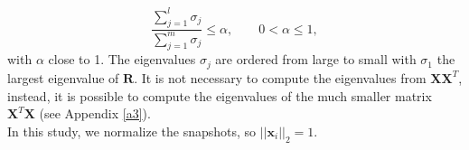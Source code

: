 \documentclass[12pt]{article}
\begin{document}
\begin{equation}
\frac{\sum_{j=1}^l\sigma_j}{\sum_{j=1}^m\sigma_j}\leq \alpha, \qquad 0<\alpha \leq 1,
\end{equation}
with $\alpha$ close to 1. The eigenvalues $\sigma_j$ are ordered from large to small with $\sigma_1$
the largest eigenvalue of $\mathbf{R}$. 
It is not necessary to compute the eigenvalues from $\mathbf{X}\mathbf{X}^T$, instead, it is possible to compute the eigenvalues of the much smaller matrix $\mathbf{X}^T\mathbf{X}$ (see Appendix \ref{a3}). \\
In this study, we normalize the snapshots, so $||\mathbf{x}_i||_2=1.$

\newpage
\end{document}
